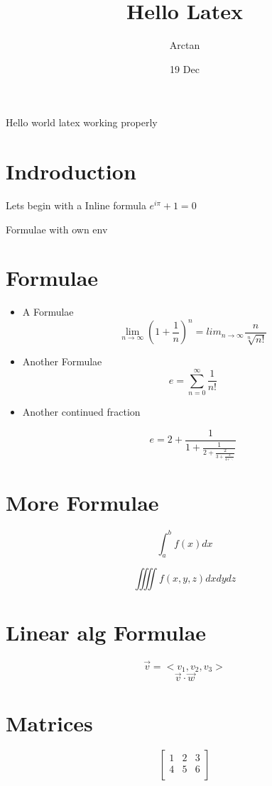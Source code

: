 \documentclass{article}
\title{Hello Latex}
\author{Arctan}
\date{19 Dec}
\begin{document}
    \maketitle
    Hello world  latex working properly
    \section{Indroduction}

    Lets begin with a Inline formula $e^{i\pi} + 1 =0$

Formulae with own env
    \section*{Formulae}
    \begin{itemize}  %
   \item A Formulae
     $$ \lim_{n\to\infty} \left(1+\frac{1}{n}\right)^n = lim_{n\to\infty}\frac{n}{\sqrt[n]{n!}} $$

   \item Another Formulae
     $$e = \sum_{n=0}^{\infty}\frac{1}{n!}$$
    
  \item  Another continued fraction

     $$e = 2+\frac{1}{1+\frac{1}{2+\frac{2}{3+\frac{3}{4+\ddots}}}}$$

\end{itemize}
    \section{More Formulae}

     $$ \int_a^bf(x)dx $$

    $$\iiiint f(x,y,z)dxdydz$$

    \section{Linear alg Formulae}
    $$\vec{v}=<v_1, v_2,v_3>$$
    $$\vec{v}\cdot\vec{w}$$

    \section{Matrices}
    $$\begin{bmatrix}
      1 & 2 & 3\\
      4 & 5 & 6 \\
    \end{bmatrix}
    $$
\end{document}
